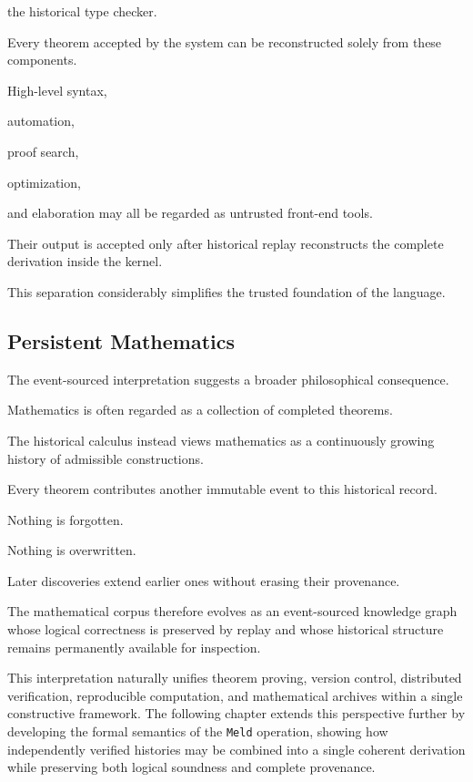 \documentclass[12pt,oneside]{article}
\theoremstyle{definition}
\theoremstyle{remark}
\begin{document}
the historical type checker.

Every theorem accepted by the system can be reconstructed solely from these
components.

High-level syntax,

automation,

proof search,

optimization,

and elaboration may all be regarded as untrusted front-end tools.

Their output is accepted only after historical replay reconstructs the complete
derivation inside the kernel.

This separation considerably simplifies the trusted foundation of the language.

\subsection{Persistent Mathematics}

The event-sourced interpretation suggests a broader philosophical consequence.

Mathematics is often regarded as a collection of completed theorems.

The historical calculus instead views mathematics as a continuously growing
history of admissible constructions.

Every theorem contributes another immutable event to this historical record.

Nothing is forgotten.

Nothing is overwritten.

Later discoveries extend earlier ones without erasing their provenance.

The mathematical corpus therefore evolves as an event-sourced knowledge graph
whose logical correctness is preserved by replay and whose historical structure
remains permanently available for inspection.

This interpretation naturally unifies theorem proving, version control,
distributed verification, reproducible computation, and mathematical archives
within a single constructive framework. The following chapter extends this
perspective further by developing the formal semantics of the \texttt{Meld}
operation, showing how independently verified histories may be combined into a
single coherent derivation while preserving both logical soundness and complete
provenance.

\end{document}
